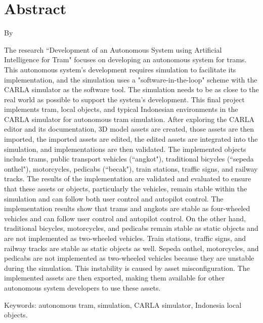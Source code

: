 \chapter*{Abstract}

\begin{center}
	\center
	\begin{onehalfspace}
		\Large \bfseries \MakeUppercase{\thetitleinenglish}

		\normalfont \normalsize
		By

		\theauthor
	\end{onehalfspace}
\end{center}

\begin{singlespace}
	The research ``Development of an Autonomous System using Artificial
	Intelligence for Tram" focuses on developing an autonomous system for
	trams. This autonomous system's development requires simulation to
	facilitate its implementation, and the simulation uses a
	"software-in-the-loop" scheme with the CARLA simulator as the software tool.
	The simulation needs to be as close to the real world as possible to support
	the system's development. This final project implements tram, local objects,
	and typical Indonesian environments in the CARLA simulator for autonomous
	tram simulation. After exploring the CARLA editor and its documentation, 3D
	model assets are created, those assets are then imported, the imported
	assets are edited, the edited assets are integrated into the simulation, and
	implementations are then validated. The implemented objects include trams,
	public transport vehicles (``angkot"), traditional bicycles (``sepeda
	onthel"), motorcycles, pedicabs (``becak"), train stations, traffic signs,
	and railway tracks. The results of the implementation are validated and
	evaluated to ensure that these assets or objects, particularly the vehicles,
	remain stable within the simulation and can follow both user control and
	autopilot control. The implementation results show that trams and angkots
	are stable as four-wheeled vehicles and can follow user control and
	autopilot control. On the other hand, traditional bicycles, motorcycles, and
	pedicabs remain stable as static objects and are not implemented as
	two-wheeled vehicles. Train stations, traffic signs, and railway tracks are
	stable as static objects as well. Sepeda onthel, motorcycles, and pedicabs
	are not implemented as two-wheeled vehicles because they are unstable during
	the simulation. This instability is caused by asset misconfiguration. The
	implemented assets are then exported, making them available for other
	autonomous system developers to use these assets.

	Keywords: autonomous tram, simulation, CARLA simulator, Indonesia local
	objects.
\end{singlespace}

\clearpage

